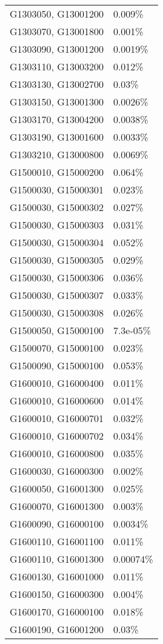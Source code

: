 \begin{longtable}[]{@{}ll@{}}
G1303050, G13001200 & 0.009\% \\
G1303070, G13001800 & 0.001\% \\
G1303090, G13001200 & 0.0019\% \\
G1303110, G13003200 & 0.012\% \\
G1303130, G13002700 & 0.03\% \\
G1303150, G13001300 & 0.0026\% \\
G1303170, G13004200 & 0.0038\% \\
G1303190, G13001600 & 0.0033\% \\
G1303210, G13000800 & 0.0069\% \\
G1500010, G15000200 & 0.064\% \\
G1500030, G15000301 & 0.023\% \\
G1500030, G15000302 & 0.027\% \\
G1500030, G15000303 & 0.031\% \\
G1500030, G15000304 & 0.052\% \\
G1500030, G15000305 & 0.029\% \\
G1500030, G15000306 & 0.036\% \\
G1500030, G15000307 & 0.033\% \\
G1500030, G15000308 & 0.026\% \\
G1500050, G15000100 & 7.3e-05\% \\
G1500070, G15000100 & 0.023\% \\
G1500090, G15000100 & 0.053\% \\
G1600010, G16000400 & 0.011\% \\
G1600010, G16000600 & 0.014\% \\
G1600010, G16000701 & 0.032\% \\
G1600010, G16000702 & 0.034\% \\
G1600010, G16000800 & 0.035\% \\
G1600030, G16000300 & 0.002\% \\
G1600050, G16001300 & 0.025\% \\
G1600070, G16001300 & 0.003\% \\
G1600090, G16000100 & 0.0034\% \\
G1600110, G16001100 & 0.011\% \\
G1600110, G16001300 & 0.00074\% \\
G1600130, G16001000 & 0.011\% \\
G1600150, G16000300 & 0.004\% \\
G1600170, G16000100 & 0.018\% \\
G1600190, G16001200 & 0.03\% \\

\end{longtable}
